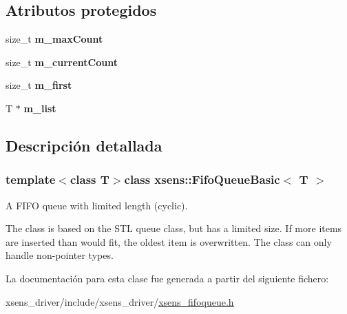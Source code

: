 \subsection*{\-Atributos protegidos}
\begin{DoxyCompactItemize}
\item 
\hypertarget{classxsens_1_1FifoQueueBasic_a4f40352af305fcc00d029e8e732bed68}{size\-\_\-t {\bfseries m\-\_\-max\-Count}}\label{classxsens_1_1FifoQueueBasic_a4f40352af305fcc00d029e8e732bed68}

\item 
\hypertarget{classxsens_1_1FifoQueueBasic_acdc35d9bf7cd4616ac6f6d12be44c9f5}{size\-\_\-t {\bfseries m\-\_\-current\-Count}}\label{classxsens_1_1FifoQueueBasic_acdc35d9bf7cd4616ac6f6d12be44c9f5}

\item 
\hypertarget{classxsens_1_1FifoQueueBasic_a85c7677c78c9f0e7e2b45a9db3181cae}{size\-\_\-t {\bfseries m\-\_\-first}}\label{classxsens_1_1FifoQueueBasic_a85c7677c78c9f0e7e2b45a9db3181cae}

\item 
\hypertarget{classxsens_1_1FifoQueueBasic_a040a46f15f35e7712bacc1a6a92b3e9a}{\-T $\ast$ {\bfseries m\-\_\-list}}\label{classxsens_1_1FifoQueueBasic_a040a46f15f35e7712bacc1a6a92b3e9a}

\end{DoxyCompactItemize}


\subsection{\-Descripción detallada}
\subsubsection*{template$<$class \-T$>$class xsens\-::\-Fifo\-Queue\-Basic$<$ T $>$}

\-A \-F\-I\-F\-O queue with limited length (cyclic). 

\-The class is based on the \-S\-T\-L queue class, but has a limited size. \-If more items are inserted than would fit, the oldest item is overwritten. \-The class can only handle non-\/pointer types. 

\-La documentación para esta clase fue generada a partir del siguiente fichero\-:\begin{DoxyCompactItemize}
\item 
xsens\-\_\-driver/include/xsens\-\_\-driver/\hyperlink{xsens__fifoqueue_8h}{xsens\-\_\-fifoqueue.\-h}\end{DoxyCompactItemize}
